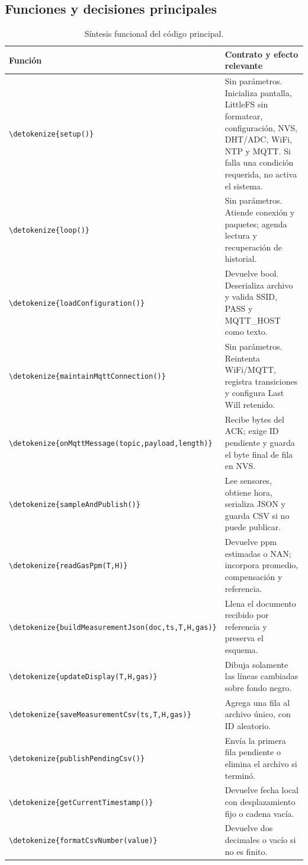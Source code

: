 \documentclass[11pt,a4paper]{article}
\newcommand{\code}[1]{\expandafter\nolinkurl\expandafter{\detokenize{#1}}}
\begin{document}
\subsection{Funciones y decisiones principales}
\begin{table}[h!]
\small
\begin{tabularx}{\linewidth}{@{}P{44mm}Y@{}}
\toprule
\textbf{Función} & \textbf{Contrato y efecto relevante}\\\midrule
\code{setup()} & Sin parámetros. Inicializa pantalla, LittleFS sin formatear, configuración, NVS, DHT/ADC, WiFi, NTP y MQTT. Si falla una condición requerida, no activa el sistema.\\
\code{loop()} & Sin parámetros. Atiende conexión y paquetes; agenda lectura y recuperación de historial.\\
\code{loadConfiguration()} & Devuelve bool. Deserializa archivo y valida SSID, PASS y MQTT\_HOST como texto.\\
\code{maintainMqttConnection()} & Sin parámetros. Reintenta WiFi/MQTT, registra transiciones y configura Last Will retenido.\\
\code{onMqttMessage(topic,payload,length)} & Recibe bytes del ACK; exige ID pendiente y guarda el byte final de fila en NVS.\\
\code{sampleAndPublish()} & Lee sensores, obtiene hora, serializa JSON y guarda CSV si no puede publicar.\\
\code{readGasPpm(T,H)} & Devuelve ppm estimadas o NAN; incorpora promedio, compensación y referencia.\\
\code{buildMeasurementJson(doc,ts,T,H,gas)} & Llena el documento recibido por referencia y preserva el esquema.\\
\code{updateDisplay(T,H,gas)} & Dibuja solamente las líneas cambiadas sobre fondo negro.\\
\code{saveMeasurementCsv(ts,T,H,gas)} & Agrega una fila al archivo único, con ID aleatorio.\\
\code{publishPendingCsv()} & Envía la primera fila pendiente o elimina el archivo si terminó.\\
\code{getCurrentTimestamp()} & Devuelve fecha local con desplazamiento fijo o cadena vacía.\\
\code{formatCsvNumber(value)} & Devuelve dos decimales o vacío si no es finito.\\
\bottomrule
\end{tabularx}
\caption{Síntesis funcional del código principal.}
\end{table}
\end{document}
